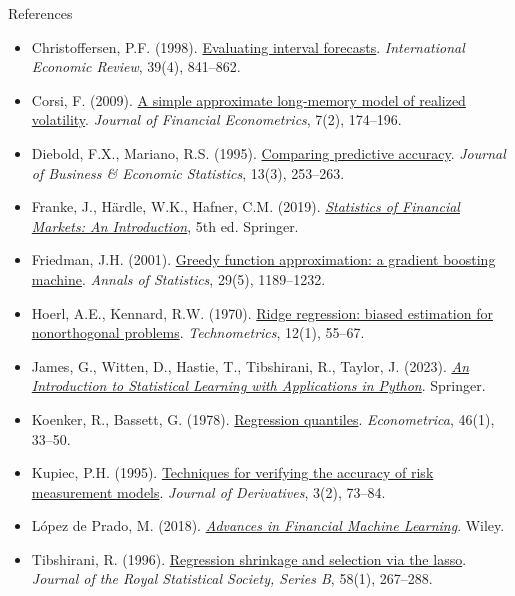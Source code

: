 \begin{frame}{References}
\itemsize{\tiny}
\begin{itemize}
    \item Christoffersen, P.F. (1998). \href{https://doi.org/10.2307/2527341}{Evaluating interval forecasts}. \textit{International Economic Review}, 39(4), 841--862.
    \item Corsi, F. (2009). \href{https://doi.org/10.1093/jjfinec/nbp001}{A simple approximate long-memory model of realized volatility}. \textit{Journal of Financial Econometrics}, 7(2), 174--196.
    \item Diebold, F.X., Mariano, R.S. (1995). \href{https://doi.org/10.1080/07350015.1995.10524599}{Comparing predictive accuracy}. \textit{Journal of Business \& Economic Statistics}, 13(3), 253--263.
    \item Franke, J., Härdle, W.K., Hafner, C.M. (2019). \href{https://doi.org/10.1007/978-3-030-13751-9}{\textit{Statistics of Financial Markets: An Introduction}}, 5th ed. Springer.
    \item Friedman, J.H. (2001). \href{https://doi.org/10.1214/aos/1013203451}{Greedy function approximation: a gradient boosting machine}. \textit{Annals of Statistics}, 29(5), 1189--1232.
    \item Hoerl, A.E., Kennard, R.W. (1970). \href{https://doi.org/10.1080/00401706.1970.10488634}{Ridge regression: biased estimation for nonorthogonal problems}. \textit{Technometrics}, 12(1), 55--67.
    \item James, G., Witten, D., Hastie, T., Tibshirani, R., Taylor, J. (2023). \href{https://doi.org/10.1007/978-3-031-38747-0}{\textit{An Introduction to Statistical Learning with Applications in Python}}. Springer.
    \item Koenker, R., Bassett, G. (1978). \href{https://doi.org/10.2307/1913643}{Regression quantiles}. \textit{Econometrica}, 46(1), 33--50.
    \item Kupiec, P.H. (1995). \href{https://doi.org/10.3905/jod.1995.407942}{Techniques for verifying the accuracy of risk measurement models}. \textit{Journal of Derivatives}, 3(2), 73--84.
    \item López de Prado, M. (2018). \href{https://www.wiley.com/en-us/Advances+in+Financial+Machine+Learning-p-9781119482086}{\textit{Advances in Financial Machine Learning}}. Wiley.
    \item Tibshirani, R. (1996). \href{https://doi.org/10.1111/j.2517-6161.1996.tb02080.x}{Regression shrinkage and selection via the lasso}. \textit{Journal of the Royal Statistical Society, Series B}, 58(1), 267--288.
\end{itemize}
\end{frame}



